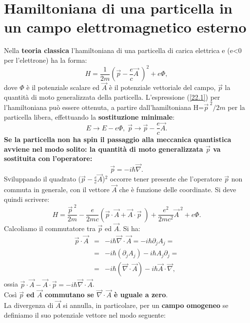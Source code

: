 \chapter[Particella in campo elettromagnetico]{Hamiltoniana di una particella in un campo elettromagnetico esterno}
Nella \textbf{teoria classica} l'hamiltoniana di una particella di carica elettrica e (e<0 per l'elettrone) ha la forma:
\begin{equation}
H=\frac{1}{2m}(\vec{p}-\frac{e}{c}\vec{A}\;)^{2}+e\Phi ,
\label{22.1}
\end{equation}
dove $\Phi$ è il potenziale scalare ed $\vec{A}$ è il potenziale vettoriale del campo, $\vec{p}$ la quantità di moto generalizzata della particella.
L'espressione (\ref{22.1}) per l'hamiltoniana può essere ottenuta, a partire dall'hamiltoniana H=$\vec{p}^{\;2}/2m$ per la particella libera, effettuando la \textbf{sostituzione minimale}:
\begin{equation}
E\rightarrow E-e\Phi,\; \vec{p}\rightarrow \vec{p}-\frac{e}{c}\vec{A} .
\end{equation}
\textbf{Se la particella non ha spin il passaggio alla meccanica quantistica avviene nel modo solito: la quantità di moto generalizzata $\vec{p}$ va sostituita con l'operatore:}
\begin{equation}
\vec{p}=-i\hbar \vec{\nabla} .
\end{equation}
Sviluppando il quadrato ($\vec{p}-\frac{e}{c}\vec{A}$)$^{2}$ occorre tener presente che l'operatore $\vec{p}$ non commuta in generale, con il vettore $\vec{A}$ che è funzione delle coordinate. Si deve quindi scrivere:
\begin{equation}
H= \frac{\vec{p}^{\;2}}{2m}-\frac{e}{2mc}(\vec{p}\cdot\vec{A}+\vec{A}\cdot\vec{p}\;)+\frac{e^{2}}{2mc^{2}}\vec{A}^{\;2}+e\Phi .
\label{22.4}
\end{equation}
Calcoliamo il commutatore tra $\vec{p}$ ed $\vec{A}$. Si ha:
\begin{eqnarray}
\vec{p}\cdot\vec{A}&=&-i\hbar \vec{\nabla}\cdot\vec{A}=-i\hbar\partial_{j}A_{j}= \nonumber \\
&=&-i\hbar(\partial_{j}A_{j})-i\hbar A_{j}\partial_{j}= \nonumber \\
&=& -i\hbar(\vec{\nabla}\cdot\vec{A})-i\hbar\vec{A}\cdot\vec{\nabla} ,
\end{eqnarray}
ossia $\vec{p}\cdot\vec{A}-\vec{A}\cdot\vec{p}=-i\hbar\vec{\nabla}\cdot\vec{A}$.\\ Così \textbf{$\vec{p}$ ed $\vec{A}$ commutano se $\vec{\nabla}\cdot\vec{A}$ è uguale a zero}.\\ La divergenza di $\vec{A}$ si annulla, in particolare, per un \textbf{campo omogeneo} se definiamo il suo potenziale vettore nel modo seguente:
